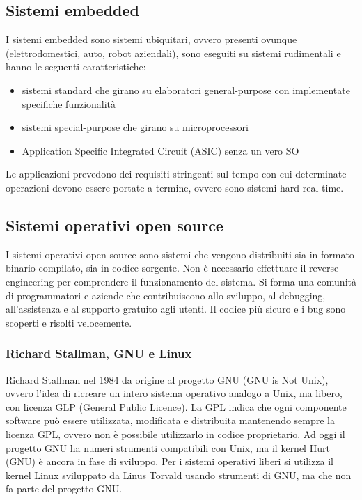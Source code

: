 \documentclass[a4paper]{article}
\begin{document}
\subsection{Sistemi embedded}
I sistemi embedded sono sistemi ubiquitari, ovvero presenti ovunque (elettrodomestici, auto, robot aziendali), sono eseguiti su
sistemi rudimentali e hanno le seguenti caratteristiche:
\begin{itemize}
	\item sistemi standard che girano su elaboratori general-purpose con implementate specifiche funzionalità
	\item sistemi special-purpose che girano su microprocessori
	\item Application Specific Integrated Circuit (ASIC) senza un vero SO
\end{itemize}
Le applicazioni prevedono dei requisiti stringenti sul tempo con cui determinate operazioni devono essere portate a termine, ovvero
sono sistemi hard real-time.

\subsection{Sistemi operativi open source}
I sistemi operativi open source sono sistemi che vengono distribuiti sia in formato binario compilato, sia in codice sorgente.
Non è necessario effettuare il reverse engineering per comprendere il funzionamento del sistema. Si forma una comunità di
programmatori e aziende che contribuiscono allo sviluppo, al debugging, all’assistenza e al supporto gratuito agli utenti.
Il codice più sicuro e i bug sono scoperti e risolti velocemente.

\subsubsection*{Richard Stallman, GNU e Linux}
Richard Stallman nel 1984 da origine al progetto GNU (GNU is Not Unix), ovvero l'idea di ricreare un intero sistema operativo
analogo a Unix, ma libero, con licenza GLP (General Public Licence). La GPL indica che ogni componente software può essere
utilizzata, modificata e distribuita mantenendo sempre la licenza GPL, ovvero non è possibile utilizzarlo in codice proprietario.
Ad oggi il progetto GNU ha numeri strumenti compatibili con Unix, ma il kernel Hurt (GNU) è ancora in fase di sviluppo. Per i
sistemi operativi liberi si utilizza il kernel Linux sviluppato da Linus Torvald usando strumenti di GNU, ma che non fa parte
del progetto GNU.
\end{document}
